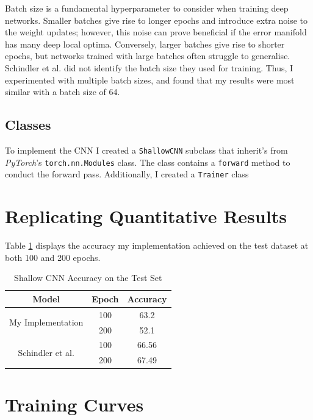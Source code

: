 \documentclass[conference]{IEEEtran}
\begin{document}
Batch size is a fundamental hyperparameter to consider when training deep networks.
Smaller batches give rise to longer epochs and introduce extra noise to the weight updates; however, this noise can prove beneficial if the error manifold has many deep local optima.
Conversely, larger batches give rise to shorter epochs, but networks trained with large batches often struggle to generalise.
Schindler et al. did not identify the batch size they used for training.
Thus, I experimented with multiple batch sizes, and found that my results were most similar with a batch size of 64.

\subsection{Classes}

To implement the CNN I created a \texttt{ShallowCNN} subclass that inherit's from \textit{PyTorch}'s \texttt{torch.nn.Modules} class.
The class contains a \texttt{forward} method to conduct the forward pass.
Additionally, I created a \texttt{Trainer} class 

\section{Replicating Quantitative Results}

Table \ref{shallow_results} displays the accuracy my implementation achieved on the test dataset at both 100 and 200 epochs.

\begin{table}[htbp]
    \caption{Shallow CNN Accuracy on the Test Set}
    \begin{center}
    \begin{tabular}{|c|c|c|}
    \hline
    \textbf{Model}&\textbf{Epoch}&\textbf{Accuracy}\\
    \hline
    \multirow{ 2}{*}{My Implementation} & 100 & 63.2\\
    & 200 & 52.1\\
    \hline
    \multirow{ 2}{*}{Schindler et al.} & 100 & 66.56\\
    & 200 & 67.49\\
    \hline
    \end{tabular}
    \label{shallow_results}
    \end{center}
\end{table}

\section{Training Curves}
\end{document}
